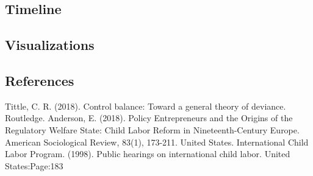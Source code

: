 \documentclass[11pt, a4paper, margin=1in]{IEEEtran}
\begin{document}
\subsection{Timeline}

\subsection{Visualizations}




\subsection{References}
\begin{thebibliography}{9}
    Tittle, C. R. (2018). Control balance: Toward a general theory of deviance. Routledge.
    Anderson, E. (2018). Policy Entrepreneurs and the Origins of the Regulatory Welfare State: Child Labor Reform in Nineteenth-Century Europe. American Sociological Review, 83(1), 173-211.
    United States. International Child Labor Program. (1998). Public hearings on international child labor. United States:Page:183
\end{thebibliography}
\end{document}
